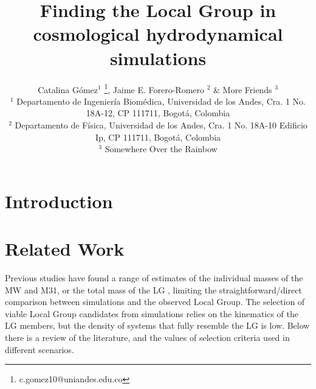 \documentclass[fleqn,usenatbib]{mnras}
\begin{document}
\title[The Local Group in Simulations]{Finding the Local Group in 
cosmological hydrodynamical simulations}  

\author[Catalina G\'omez et al.]{
  Catalina G\'omez$^{1}$
  \thanks{c.gomez10@uniandes.edu.co},
  Jaime E. Forero-Romero $^{2}$
  \&
  More Friends $^{3}$
  \\
  $^{1}$ Departamento de Ingenier\'ia Biom\'edica, Universidad de los
  Andes, Cra. 1 No. 18A-12, CP 111711, Bogot\'a, Colombia \\
  $^{2}$ Departamento de F\'isica, Universidad de los Andes, Cra. 1
  No. 18A-10 Edificio Ip, CP 111711, Bogot\'a, Colombia \\
  $^{3}$ Somewhere Over the Rainbow\\
}

\maketitle

\begin{abstract}

 \end{abstract}


\section{Introduction}
 
\section{Related Work}
Previous studies have found a range of estimates of the individual
masses of the MW and M31, or the total mass of the LG
\citep{2016MNRAS.457..844F}, limiting the straightforward/direct
comparison between simulations and the observed Local Group. The
selection of viable Local Group candidates from simulations relies on
the kinematics of the LG members, but the density of systems that
fully resemble the LG is low. Below there is a review of the
literature, and the values of selection criteria used in different
scenarios.   
\end{document}

